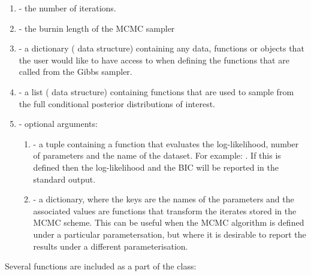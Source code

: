 \documentclass[article]{jss}
\begin{document}
\begin{enumerate}
\item {} - the number of iterations. 
\item {} - the burnin length of the MCMC sampler 
\item {} - a dictionary ( data structure)
  containing any data, functions or objects that the user would like
  to have access to when defining the functions that are called from
  the Gibbs sampler.
\item {} - a list ( data structure)
  containing functions that are used to sample from the full
  conditional posterior distributions of interest.
\item {} - optional arguments:
  
  \begin{enumerate}
  \item {} - a tuple containing a function that evaluates the log-likelihood,
    number of parameters and the name of the dataset. For example: . If this is defined then the log-likelihood
    and the BIC will be reported in the standard output.
  \item {} - a dictionary, where the keys are the names of the parameters
    and the associated values are functions that transform the iterates
    stored in the MCMC scheme. This can be useful when the MCMC algorithm
    is defined under a particular parametersation, but where it is desirable
    to report the results under a different parameterisation.
\end{enumerate}
\end{enumerate}
Several functions are included as a part of the class: 
\end{document}
